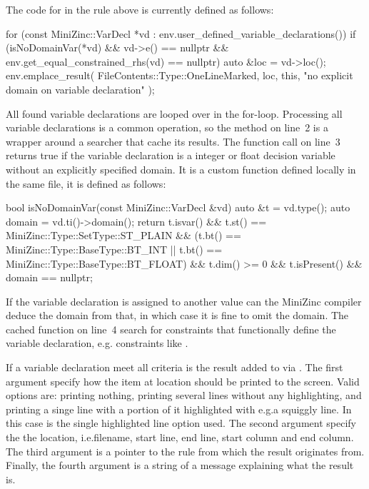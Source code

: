 \documentclass[a4paper,12pt]{article}
\begin{document}
The code for  in the rule above is currently defined as follows:
\begin{cppp}
for (const MiniZinc::VarDecl *vd
     : env.user_defined_variable_declarations()) {
  if (isNoDomainVar(*vd) && vd->e() == nullptr &&
      env.get_equal_constrained_rhs(vd) == nullptr)
  {
    auto &loc = vd->loc();
    env.emplace_result(
      FileContents::Type::OneLineMarked, loc, this,
      "no explicit domain on variable declaration"
    );
  }
}
\end{cppp}
All found variable declarations are looped over in the for-loop. Processing all variable
declarations is a common operation, so the method on line~2 is a wrapper around a searcher
that cache its results. The function call on line~3 returns true if the variable declaration is
a integer or float decision variable without an explicitly specified domain. It is a custom function
defined locally in the same file, it is defined as follows:
\begin{cppp}[style=nonumbers]
bool isNoDomainVar(const MiniZinc::VarDecl &vd) {
  auto &t = vd.type();
  auto domain = vd.ti()->domain();
  return t.isvar()
    && t.st() == MiniZinc::Type::SetType::ST_PLAIN
    && (t.bt() == MiniZinc::Type::BaseType::BT_INT ||
        t.bt() == MiniZinc::Type::BaseType::BT_FLOAT)
    && t.dim() >= 0
    && t.isPresent()
    && domain == nullptr;
}
\end{cppp}

If the variable declaration is assigned to another value can the MiniZinc compiler deduce the
domain from that, in which case it is fine to omit the domain. The cached function on line~4
search for constraints that functionally define the variable declaration, e.g.\@
constraints like .

\begin{sloppypar}
If a variable declaration meet all criteria is the result added to  via
. The first argument specify how the item at location  should be
printed to the screen. Valid options are: printing nothing, printing several lines without
any highlighting, and printing a singe line with a portion of it highlighted with e.g.\@ a
squiggly line. In this case is the single highlighted line option used. The second
argument specify the the location, i.e.\@ filename, start line, end line, start column and end
column. The third argument is a pointer to the rule from which the result originates from.
Finally, the fourth argument is a string of a message explaining what the result is.
\end{sloppypar}
\end{document}
